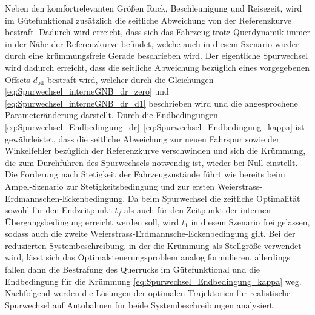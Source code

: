 Neben den komfortrelevanten Größen Ruck, Beschleunigung und Reisezeit, wird im Gütefunktional zusätzlich die seitliche Abweichung von der Referenzkurve bestraft. Dadurch wird erreicht, dass sich das Fahrzeug trotz Querdynamik immer in der Nähe der Referenzkurve befindet, welche auch in diesem Szenario wieder durch eine krümmungsfreie Gerade beschrieben wird. Der eigentliche Spurwechsel wird dadurch erreicht, dass die seitliche Abweichung bezüglich eines vorgegebenen Offsets $d_{\textrm{off}}$ bestraft wird, welcher durch die Gleichungen \eqref{eq:Spurwechsel_interneGNB_dr_zero} und \eqref{eq:Spurwechsel_interneGNB_dr_d1} beschrieben wird und die angesprochene Parameteränderung darstellt. Durch die Endbedingungen \eqref{eq:Spurwechsel_Endbedingung_dr}--\eqref{eq:Spurwechsel_Endbedingung_kappa} ist gewährleistet, dass die seitliche Abweichung zur neuen Fahrspur sowie der Winkelfehler bezüglich der Referenzkurve verschwinden und sich die Krümmung, die zum Durchführen des Spurwechsels notwendig ist, wieder bei Null einstellt. Die Forderung nach Stetigkeit der Fahrzeugzustände führt wie bereits beim Ampel-Szenario zur Stetigkeitsbedingung und zur ersten Weierstrass-Erdmannschen-Eckenbedingung. Da beim Spurwechsel die zeitliche Optimalität sowohl für den Endzeitpunkt $t_f$ als auch für den Zeitpunkt der internen Übergangsbedingung erreicht werden soll, wird $t_1$ in diesem Szenario frei gelassen, sodass auch die zweite Weierstrass-Erdmannsche-Eckenbedingung gilt. Bei der reduzierten Systembeschreibung, in der die Krümmung als Stellgröße verwendet wird, lässt sich das Optimalsteuerungsproblem analog formulieren, allerdings fallen dann die Bestrafung des Querrucks im Gütefunktional und die Endbedingung für die Krümmung \eqref{eq:Spurwechsel_Endbedingung_kappa} weg. Nachfolgend werden die Lösungen der optimalen Trajektorien für realistische Spurwechsel auf Autobahnen für beide Systembeschreibungen analysiert.

